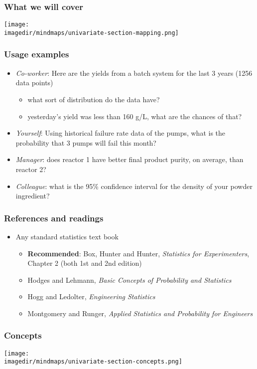 \begin{frame}\frametitle{What we will cover}
	\texttt{[image: \\imagedir/mindmaps/univariate-section-mapping.png]}
\end{frame}

\begin{frame}\frametitle{Usage examples}
	\begin{itemize}
		\item	\emph{Co-worker}: Here are the yields from a batch system for the last 3 years (1256 data points)
		\begin{itemize}
			\item	what sort of distribution do the data have?
			\item	yesterday's yield was less than 160 g/L, what are the chances of that?
		\end{itemize}
		\item	\emph{Yourself}: Using historical failure rate data of the pumps, what is the probability that 3 pumps will fail this month?
		\item	\emph{Manager}: does reactor 1 have better final product purity, on average, than reactor 2?
		\item	\emph{Colleague}: what is the 95\% confidence interval for the density of your powder ingredient?
	\end{itemize}
\end{frame}

\begin{frame}\frametitle{References and readings}
	\begin{itemize}
		\item	Any standard statistics text book
		\begin{itemize}
			\item	\textbf{Recommended}: Box, Hunter and Hunter, \emph{Statistics for Experimenters}, Chapter 2 (both 1st and 2nd edition)
			\item	Hodges and Lehmann, \emph{Basic Concepts of Probability and Statistics}
			\item	Hogg and Ledolter, \emph{Engineering Statistics}
			\item	Montgomery and Runger, \emph{Applied Statistics and Probability for Engineers}
		\end{itemize}
	\end{itemize}
\end{frame}

\begin{frame}\frametitle{Concepts}
	\begin{center}
		\texttt{[image: \\imagedir/mindmaps/univariate-section-concepts.png]}
	\end{center}
\end{frame}

